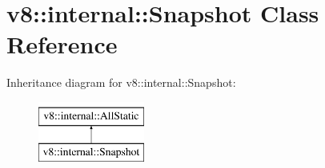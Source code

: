 \hypertarget{classv8_1_1internal_1_1Snapshot}{}\section{v8\+:\+:internal\+:\+:Snapshot Class Reference}
\label{classv8_1_1internal_1_1Snapshot}
Inheritance diagram for v8\+:\+:internal\+:\+:Snapshot\+:\begin{figure}[H]
\begin{center}
\leavevmode
\includegraphics[height=2.000000cm]{classv8_1_1internal_1_1Snapshot}
\end{center}
\end{figure}

